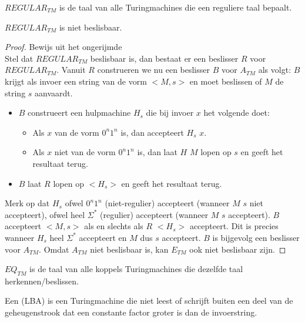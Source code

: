 \documentclass[main.tex]{subfiles}
\begin{document}
\begin{de}
  \label{de:regular-tm}
  $REGULAR_{TM}$ is de taal van alle Turingmachines die een reguliere taal bepaalt.
\end{de}

\begin{st}
  \label{st:regular-tm-niet-besl}
  $REGULAR_{TM}$ is niet beslisbaar.

  \begin{proof}
    Bewijs uit het ongerijmde\\
    Stel dat $REGULAR_{TM}$ beslisbaar is, dan bestaat er een beslisser $R$ voor $REGULAR_{TM}$.
    Vanuit $R$ construeren we nu een beslisser $B$ voor $A_{TM}$ als volgt:
    $B$ krijgt als invoer een string van de vorm $<M,s>$ en moet beslissen of $M$ de string $s$ aanvaardt.
    \begin{itemize}
    \item $B$ construeert een hulpmachine $H_{s}$ die bij invoer $x$ het volgende doet:
      \begin{itemize}
      \item Als $x$ van de vorm $0^{n}1^{n}$ is, dan accepteert $H_{s}$ $x$.
      \item Als $x$ niet van de vorm $0^{n}1^{n}$ is, dan laat $H$ $M$ lopen op $s$ en geeft het resultaat terug.
      \end{itemize}
    \item $B$ laat $R$ lopen op $<H_{s}>$ en geeft het resultaat terug.
    \end{itemize}
    Merk op dat $H_{s}$ ofwel $0^{n}1^{n}$ (niet-regulier) accepteert (wanneer $M$ $s$ niet accepteert), ofwel heel $\Sigma^{*}$ (regulier) accepteert (wanneer $M$ $s$ accepteert).
    $B$ accepteert $<M,s>$ als en slechts als $R$ $<H_{s}>$ accepteert.
    Dit is precies wanneer $H_{s}$ heel $\Sigma^{*}$ accepteert en $M$ dus $s$ accepteert.
    $B$ is bijgevolg een beslisser voor $A_{TM}$.
    Omdat $A_{TM}$ niet beslisbaar is, kan $E_{TM}$ ook niet beslisbaar zijn.
  \end{proof}
\end{st}

\begin{de}
  \label{de:eq-tm}
  $EQ_{TM}$ is de taal van alle koppels Turingmachines die dezelfde taal herkennen/beslissen.
\end{de}

\begin{de}
  Een  (LBA) is een Turingmachine die niet leest of schrijft buiten een deel van de geheugenstrook dat een constante factor groter is dan de invoerstring.
\end{de}
\end{document}
